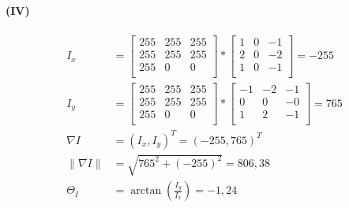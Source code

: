 \documentclass[a4paper]{article}
\begin{document}
\paragraph{(IV)}
\begin{align*}
    I_x &= \begin{bmatrix}
        255 & 255 & 255\\
        255 & 255 & 255\\
        255 & 0 & 0\\
        \end{bmatrix}
         * 
         \begin{bmatrix}
        1 & 0 & -1\\
        2 & 0 & -2\\
        1 & 0 & -1\\
        \end{bmatrix}
        = -255\\
        I_y &= \begin{bmatrix}
        255 & 255 & 255\\
        255 & 255 & 255\\
        255 & 0 & 0\\
        \end{bmatrix}
         * 
         \begin{bmatrix}
        -1 & -2 & -1\\
        0 & 0 & -0\\
        1 & 2 & -1\\
        \end{bmatrix}
        = 765\\
        \nabla I &= (I_x,I_y)^T = (-255,765)^T\\
        \| \nabla I\| &= \sqrt{765^2+(-255)^2} = 806,38\\
        \Theta_I &= \operatorname{arctan}(\frac{I_y}{I_x}) = -1,24
\end{align*}
\end{document}
